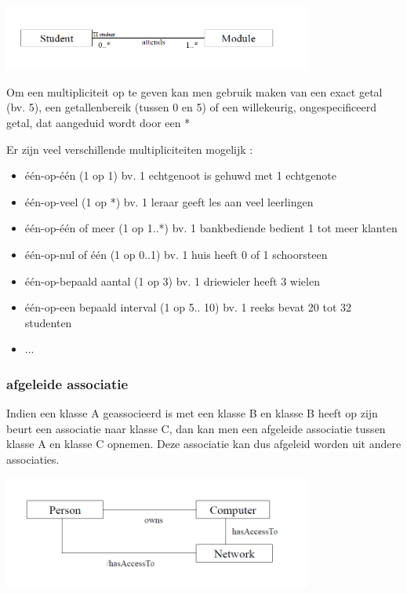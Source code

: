 
\begin{center}
\includegraphics[width=4in]{img/mul1}%
\end{center}

Om een multipliciteit op te geven kan men gebruik maken van een exact getal (bv. 5), een getallenbereik (tussen 0 en 5) of een willekeurig, ongespecificeerd getal, dat aangeduid wordt door een *

Er zijn veel verschillende multipliciteiten mogelijk :

\begin{itemize}
    \item één-op-één (1 op 1)
bv. 1 echtgenoot is gehuwd met 1 echtgenote
    \item één-op-veel (1 op *)
bv. 1 leraar geeft les aan veel leerlingen
    \item één-op-één of meer (1 op 1..*)
bv. 1 bankbediende bedient 1 tot meer klanten
    \item één-op-nul of één (1 op 0..1)
bv. 1 huis heeft 0 of 1 schoorsteen
\item één-op-bepaald aantal (1 op 3) bv. 1 driewieler heeft 3 wielen
    \item één-op-een bepaald interval (1 op 5.. 10) bv. 1 reeks bevat 20 tot 32 studenten
    \item ...
\end{itemize}

\subsubsection{afgeleide associatie}

Indien een klasse A geassocieerd is met een klasse B en klasse B heeft op zijn beurt een associatie naar klasse C, dan kan men een afgeleide associatie tussen klasse A en klasse C opnemen. Deze associatie kan dus afgeleid worden uit andere associaties.


\begin{center}
\includegraphics[width=4in]{img/dera1}%
\end{center}

